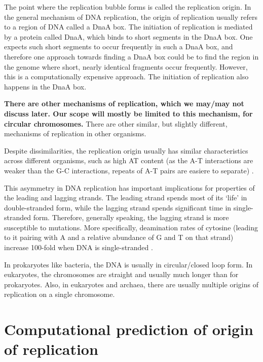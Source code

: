 \documentclass[10pt]{article}
\begin{document}
The point where the replication bubble forms is called the replication origin. In the general mechanism of DNA replication, the origin of replication usually refers to a region of DNA called a DnaA box. The initiation of replication is mediated by a protein called DnaA, which binds to short segments in the DnaA box. One expects such short segments to occur frequently in such a DnaA box, and therefore one approach towards finding a DnaA box could be to find the region in the genome where short, nearly identical fragments occur frequently. However, this is a computationally expensive approach. The initiation of replication also happens in the DnaA box. 

\textbf{There are other mechanisms of replication, which we may/may not discuss later. Our scope will mostly be limited to this mechanism, for circular chromosomes.} There are other similar, but slightly different, mechanisms of replication in other organisms.

Despite dissimilarities, the replication origin usually has similar characteristics across different organisms, such as high AT content (as the A-T interactions are weaker than the G-C interactions, repeats of A-T pairs are easiere to separate) \cite{AT}.

This asymmetry in DNA replication has important implications for properties of the leading and lagging strands. The leading strand spends most of its `life' in double-stranded form, while the lagging strand spends significant time in single-stranded form. Therefore, generally speaking, the lagging strand is more susceptible to mutations. More specifically, deamination rates of cytosine (leading to it pairing with A and a relative abundance of G and T on that strand) increase 100-fold when DNA is single-stranded \cite{deaminate, cumskew}.

In prokaryotes like bacteria, the DNA is usually in circular/closed loop form. In eukaryotes, the chromosomes are straight and usually much longer than for prokaryotes. Also, in eukaryotes and archaea, there are usually multiple origins of replication on a single chromosome.

\section{Computational prediction of origin of replication}
\end{document}
